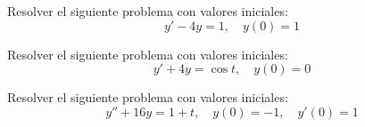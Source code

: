 \documentclass[11pt]{article}
\begin{document}
\begin{question} %
	Resolver el siguiente problema con valores iniciales:
	\[ y' - 4 y = 1, \quad y(0) = 1 \]
\end{question}

\begin{question} %
	Resolver el siguiente problema con valores iniciales:
	\[ y' + 4 y = \cos t, \quad y(0) = 0 \]
\end{question}

\begin{question} %
	Resolver el siguiente problema con valores iniciales:
	\[ y'' + 16 y = 1 + t, \quad y(0) = -1, \quad y'(0) = 1 \]
\end{question}
\end{document}
